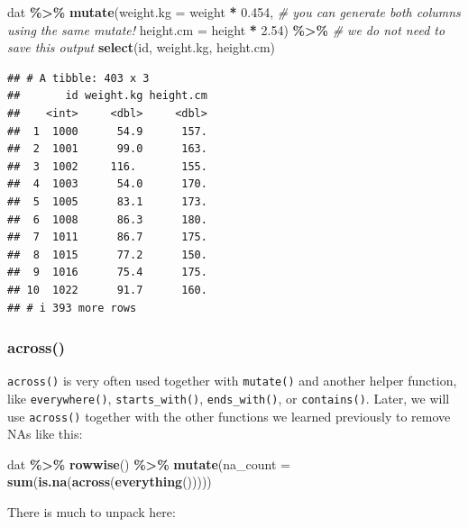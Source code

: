 \documentclass[
]{book}
\newenvironment{Shaded}{\begin{snugshade}}{\end{snugshade}}
\newcommand{\AttributeTok}[1]{\textcolor[rgb]{0.13,0.29,0.53}{#1}}
\newcommand{\CommentTok}[1]{\textcolor[rgb]{0.56,0.35,0.01}{\textit{#1}}}
\newcommand{\FloatTok}[1]{\textcolor[rgb]{0.00,0.00,0.81}{#1}}
\newcommand{\FunctionTok}[1]{\textcolor[rgb]{0.13,0.29,0.53}{\textbf{#1}}}
\newcommand{\NormalTok}[1]{#1}
\newcommand{\SpecialCharTok}[1]{\textcolor[rgb]{0.81,0.36,0.00}{\textbf{#1}}}
\begin{document}
\begin{Shaded}
\begin{Highlighting}[]
\NormalTok{dat }\SpecialCharTok{\%\textgreater{}\%}
  \FunctionTok{mutate}\NormalTok{(}\AttributeTok{weight.kg =}\NormalTok{ weight }\SpecialCharTok{*} \FloatTok{0.454}\NormalTok{,        }\CommentTok{\# you can generate both columns using the same mutate!}
         \AttributeTok{height.cm =}\NormalTok{ height }\SpecialCharTok{*} \FloatTok{2.54}\NormalTok{) }\SpecialCharTok{\%\textgreater{}\%}     \CommentTok{\# we do not need to save this output}
  \FunctionTok{select}\NormalTok{(id, weight.kg, height.cm)}
\end{Highlighting}
\end{Shaded}

\begin{verbatim}
## # A tibble: 403 x 3
##       id weight.kg height.cm
##    <int>     <dbl>     <dbl>
##  1  1000      54.9      157.
##  2  1001      99.0      163.
##  3  1002     116.       155.
##  4  1003      54.0      170.
##  5  1005      83.1      173.
##  6  1008      86.3      180.
##  7  1011      86.7      175.
##  8  1015      77.2      150.
##  9  1016      75.4      175.
## 10  1022      91.7      160.
## # i 393 more rows
\end{verbatim}

\hypertarget{across}{%
\subsubsection{across()}\label{across}}

\texttt{across()} is very often used together with \texttt{mutate()} and another helper function, like \texttt{everywhere()}, \texttt{starts\_with()}, \texttt{ends\_with()}, or \texttt{contains()}.
Later, we will use \texttt{across()} together with the other functions we learned previously to remove NAs like this:

\begin{Shaded}
\begin{Highlighting}[]
\NormalTok{dat }\SpecialCharTok{\%\textgreater{}\%}
  \FunctionTok{rowwise}\NormalTok{() }\SpecialCharTok{\%\textgreater{}\%}
  \FunctionTok{mutate}\NormalTok{(}\AttributeTok{na\_count =} \FunctionTok{sum}\NormalTok{(}\FunctionTok{is.na}\NormalTok{(}\FunctionTok{across}\NormalTok{(}\FunctionTok{everything}\NormalTok{()))))}
\end{Highlighting}
\end{Shaded}

There is much to unpack here:
\end{document}
